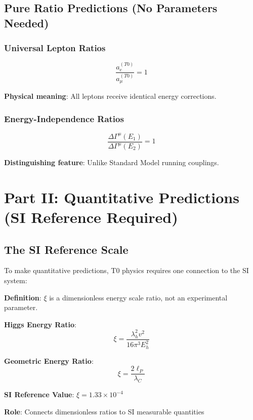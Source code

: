 \documentclass[12pt,a4paper]{article}
\newcommand{\xipar}{\xi}
\theoremstyle{definition}
\theoremstyle{remark}
\begin{document}
	\subsection{Pure Ratio Predictions (No Parameters Needed)}
	
	\subsubsection{Universal Lepton Ratios}
	
	\begin{equation}
		\boxed{\frac{a_e^{(T0)}}{a_{\mu}^{(T0)}} = 1}
		\label{eq:universal_lepton_ratio}
	\end{equation}
	
	\textbf{Physical meaning}: All leptons receive identical energy corrections.
	
	\subsubsection{Energy-Independence Ratios}
	
	\begin{equation}
		\boxed{\frac{\Delta\Gamma^{\mu}(E_1)}{\Delta\Gamma^{\mu}(E_2)} = 1}
		\label{eq:energy_independence_ratio}
	\end{equation}
	
	\textbf{Distinguishing feature}: Unlike Standard Model running couplings.
	

	\section{Part II: Quantitative Predictions (SI Reference Required)}
	
	\subsection{The SI Reference Scale}
	
	To make quantitative predictions, T0 physics requires one connection to the SI system:
	
	\begin{tcolorbox}[colback=green!5!white,colframe=green!75!black,title=SI Reference Scale (Not a Parameter!)]
		\textbf{Definition}: $\xipar$ is a dimensionless energy scale ratio, not an experimental parameter.
		
		\textbf{Higgs Energy Ratio}:
		\begin{equation}
			\xipar = \frac{\lambda_h^2 v^2}{16\pi^3 E_h^2}
		\end{equation}
		
		\textbf{Geometric Energy Ratio}:
		\begin{equation}
			\xipar = \frac{2\ell_P}{\lambda_C}
		\end{equation}
		
		\textbf{SI Reference Value}: $\xipar = 1.33 \times 10^{-4}$
		
		\textbf{Role}: Connects dimensionless ratios to SI measurable quantities
	\end{tcolorbox}
	
\end{document}

